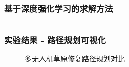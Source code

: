 \documentclass[9pt, aspectratio=169]{beamer}  %
\begin{document}
\begin{frame}
	\frametitle{基于深度强化学习的求解方法}
	\begin{columns}
		\begin{column}{0.5\textwidth}
			\centering
			
		\end{column}
		\begin{column}{0.5\textwidth}
			\centering
			
		\end{column}
	\end{columns}
\end{frame}
\begin{frame}
	\frametitle{实验结果 - 路径规划可视化}
	\begin{figure}
		\centering
		\subfloat[DRL方法]{}
		\hfill
		\subfloat[SA方法]{}

		\caption{多无人机草原修复路径规划对比}
	\end{figure}
\end{frame}
\end{document}
